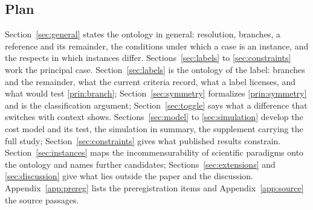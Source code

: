 \subsection{Plan}

Section~\ref{sec:general} states the ontology in general: resolution, branches, a reference and its remainder, the conditions under which a case is an instance, and the respects in which instances differ. Sections~\ref{sec:labels} to \ref{sec:constraints} work the principal case. Section~\ref{sec:labels} is the ontology of the label: branches and the remainder, what the current criteria record, what a label licenses, and what would test \autoref{prin:branch}; Section~\ref{sec:symmetry} formalizes \autoref{prin:symmetry} and is the classification argument; Section~\ref{sec:toggle} says what a difference that switches with context shows. Sections~\ref{sec:model} to \ref{sec:simulation} develop the cost model and its test, the simulation in summary, the supplement carrying the full study; Section~\ref{sec:constraints} gives what published results constrain. Section~\ref{sec:instances} maps the incommensurability of scientific paradigms onto the ontology and names further candidates; Sections~\ref{sec:extensions} and \ref{sec:discussion} give what lies outside the paper and the discussion. Appendix~\ref{app:prereg} lists the preregistration items and Appendix~\ref{app:source} the source passages.

